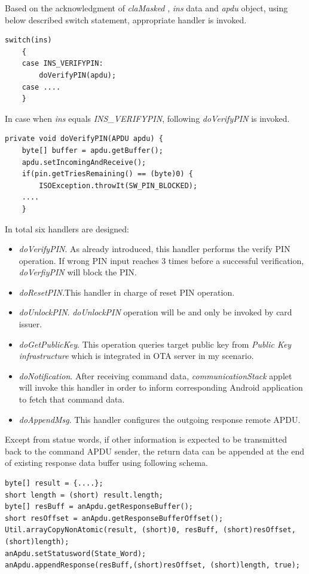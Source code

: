 Based on the acknowledgment of \emph{claMasked} , \emph{ins} data and \emph{apdu} object, using below described switch statement, appropriate handler is invoked.

\begin{Verbatim}[frame=lines,framesep=4mm, label=\fbox{\small\emph{Switch Statement}}]
switch(ins)
	{
	case INS_VERIFYPIN:
		doVerifyPIN(apdu);
	case ....
	}
\end{Verbatim}
In case when \emph{ins} equals \emph{INS\_VERIFYPIN}, following \emph{doVerifyPIN} is invoked.

\begin{Verbatim}[fontsize=\relsize{-1}, frame=lines,framesep=4mm, label=\fbox{\small\emph{doVerifyPIN Handler}}]
private void doVerifyPIN(APDU apdu) {
	byte[] buffer = apdu.getBuffer();
	apdu.setIncomingAndReceive();			
	if(pin.getTriesRemaining() == (byte)0) {
		ISOException.throwIt(SW_PIN_BLOCKED);	
	....
	}
\end{Verbatim}
In total six handlers are designed:
\begin{itemize}
\item \emph{doVerifyPIN}. As already introduced, this handler performs the verify PIN operation. If wrong PIN input reaches 3 times before a successful verification, \emph{doVerfiyPIN} will block the PIN.
\item \emph{doResetPIN}.This handler in charge of reset PIN operation.
\item \emph{doUnlockPIN}. \emph{doUnlockPIN} operation will be and only be invoked by card issuer.
\item \emph{doGetPublicKey}. This operation queries target public key from \emph{Public Key infrastructure} which is integrated in OTA server in my scenario.
\item \emph{doNotification}. After receiving command data, \emph{communicationStack} applet will invoke this handler in order to inform corresponding Android application to fetch that command data. 
\item \emph{doAppendMsg}.  This handler configures the outgoing response remote APDU.
\end{itemize}
Except from statue words, if other information is expected to be transmitted back to the command APDU sender,  the return data can be appended at the end of existing response data buffer using following schema.

\begin{Verbatim}[fontsize=\relsize{-1}, frame=lines,framesep=4mm, label=\fbox{\small\emph{Editing Response Data}}]
byte[] result = {....};
short length = (short) result.length;
byte[] resBuff = anApdu.getResponseBuffer(); 
short resOffset = anApdu.getResponseBufferOffset();
Util.arrayCopyNonAtomic(result, (short)0, resBuff, (short)resOffset, (short)length);	    
anApdu.setStatusword(State_Word);
anApdu.appendResponse(resBuff,(short)resOffset, (short)length, true);
\end{Verbatim}

